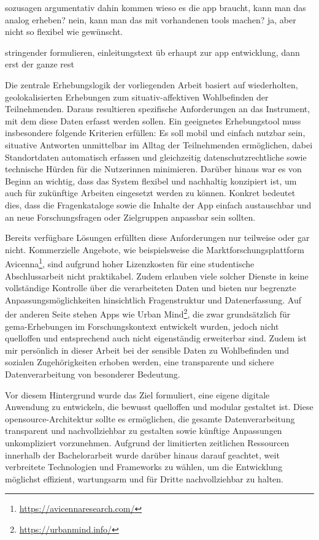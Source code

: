 sozusagen argumentativ dahin kommen wieso es die app braucht, kann man das analog erheben? nein, kann man das mit vorhandenen tools machen? ja, aber nicht so flexibel wie gewünscht.

stringender formulieren, einleitungstext üb erhaupt zur app entwicklung, dann erst der ganze rest

Die zentrale Erhebungslogik der vorliegenden Arbeit basiert auf wiederholten, geolokalisierten Erhebungen zum situativ-affektiven Wohlbefinden der Teilnehmenden. Daraus resultieren spezifische Anforderungen an das Instrument, mit dem diese Daten erfasst werden sollen. Ein geeignetes Erhebungstool muss insbesondere folgende Kriterien erfüllen: Es soll mobil und einfach nutzbar sein, situative Antworten unmittelbar im Alltag der Teilnehmenden ermöglichen, dabei Standortdaten automatisch erfassen und gleichzeitig datenschutzrechtliche sowie technische Hürden für die Nutzer\genderstern innen minimieren. Darüber hinaus war es von Beginn an wichtig, dass das System flexibel und nachhaltig konzipiert ist, um auch für zukünftige Arbeiten eingesetzt werden zu können. Konkret bedeutet dies, dass die Fragenkataloge sowie die Inhalte der App einfach austauschbar und an neue Forschungsfragen oder Zielgruppen anpassbar sein sollten.

Bereits verfügbare Lösungen erfüllten diese Anforderungen nur teilweise oder gar nicht. Kommerzielle Angebote, wie beispielsweise die Marktforschungsplattform Avicenna\footnote{\href{https://avicennaresearch.com/}{https://avicennaresearch.com/}}, sind aufgrund hoher Lizenzkosten für eine studentische Abschlussarbeit nicht praktikabel. Zudem erlauben viele solcher Dienste in keine vollständige Kontrolle über die verarbeiteten Daten und bieten nur begrenzte Anpassungsmöglichkeiten hinsichtlich Fragenstruktur und Datenerfassung. Auf der anderen Seite stehen Apps wie Urban Mind\footnote{\href{https://urbanmind.info/}{https://urbanmind.info/}}, die zwar grundsätzlich für \gls{gema}-Erhebungen im Forschungskontext entwickelt wurden, jedoch nicht quelloffen und entsprechend auch nicht eigenständig erweiterbar sind. Zudem ist mir persönlich in dieser Arbeit bei der sensible Daten zu Wohlbefinden und sozialen Zugehörigkeiten erhoben werden, eine transparente und sichere Datenverarbeitung von besonderer Bedeutung.

Vor diesem Hintergrund wurde das Ziel formuliert, eine eigene digitale Anwendung zu entwickeln, die bewusst quelloffen und modular gestaltet ist. Diese \gls{opensource}-Architektur sollte es ermöglichen, die gesamte Datenverarbeitung transparent und nachvollziehbar zu gestalten sowie künftige Anpassungen unkompliziert vorzunehmen. Aufgrund der limitierten zeitlichen Ressourcen innerhalb der Bachelorarbeit wurde darüber hinaus darauf geachtet, weit verbreitete Technologien und Frameworks zu wählen, um die Entwicklung möglichst effizient, wartungsarm und für Dritte nachvollziehbar zu halten.

